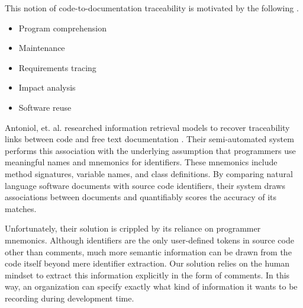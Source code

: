 This notion of code-to-documentation traceability is motivated by the following
\cite{Antoniol1999}.
\begin{itemize}
  \item Program comprehension
  \item Maintenance
  \item Requirements tracing
  \item Impact analysis
  \item Software reuse
\end{itemize}

Antoniol, et. al. researched information retrieval models to recover 
traceability links between code and free text documentation \cite{Antoniol1999,
Antoniol2000}. Their semi-automated system performs this association with the
underlying assumption that programmers use meaningful names and mnemonics for
identifiers. These mnemonics include method signatures, variable names, and
class definitions. By comparing natural language software documents with source
code identifiers, their system draws associations between documents and
quantifiably scores the accuracy of its matches.

Unfortunately, their solution is crippled by its reliance on programmer
mnemonics. Although identifiers are the only user-defined tokens in source
code other than comments, much more semantic information can be drawn from the 
code itself beyond mere identifier extraction. Our solution relies on the human
mindset to extract this information explicitly in the form of comments. In this
way, an organization can specify exactly what kind of information it wants to be
recording during development time.
